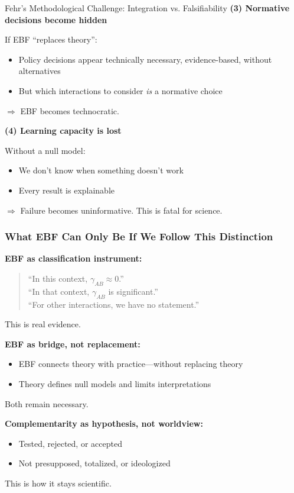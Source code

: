 \begin{chapter}{Fehr's Methodological Challenge: Integration vs. Falsifiability}
\textbf{(3) Normative decisions become hidden}

If EBF ``replaces theory'':
\begin{itemize}[noitemsep]
    \item Policy decisions appear technically necessary, evidence-based, without alternatives
    \item But which interactions to consider \textit{is} a normative choice
\end{itemize}
$\Rightarrow$ EBF becomes technocratic.

\textbf{(4) Learning capacity is lost}

Without a null model:
\begin{itemize}[noitemsep]
    \item We don't know when something doesn't work
    \item Every result is explainable
\end{itemize}
$\Rightarrow$ Failure becomes uninformative. This is fatal for science.

\subsubsection{What EBF Can Only Be If We Follow This Distinction}

\textbf{EBF as classification instrument:}
\begin{quote}
``In this context, $\gamma_{AB} \approx 0$.''\\
``In that context, $\gamma_{AB}$ is significant.''\\
``For other interactions, we have no statement.''
\end{quote}
This is real evidence.

\textbf{EBF as bridge, not replacement:}
\begin{itemize}[noitemsep]
    \item EBF connects theory with practice---without replacing theory
    \item Theory defines null models and limits interpretations
\end{itemize}
Both remain necessary.

\textbf{Complementarity as hypothesis, not worldview:}
\begin{itemize}[noitemsep]
    \item Tested, rejected, or accepted
    \item Not presupposed, totalized, or ideologized
\end{itemize}
This is how it stays scientific.


\end{chapter}

